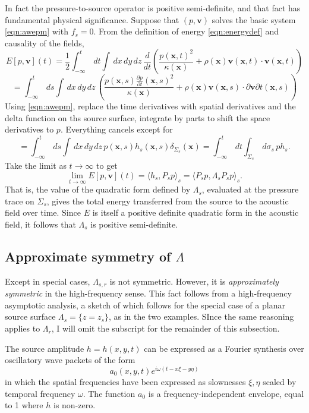 \documentclass[georeport,12pt]{geophysics}
\newcommand{\bx}{\mathbf{x}}
\newcommand{\bv}{\mathbf{v}}
\begin{document}
In fact the pressure-to-source operator is positive semi-definite, and that
fact has fundamental physical significance. Suppose that $(p,\bv)$
solves the basic system \ref{eqn:awepm} with $f_s=0$. From the
definition of energy \ref{eqn:energydef} and causality of the fields,
\[
 E[p,\bv](t) = \frac{1}{2} \int_{-\infty}^{t} \,dt \int \,dx\,dy\,dz\,
 \frac{d}{dt}\left(\frac{p(\bx,t)^2}{\kappa(\bx)} +
   \rho(\bx)\bv(\bx,t) \cdot \bv(\bx,t)\right)
\]
\[
  = \int_{-\infty}^{t} \,ds \int \,dx\,dy\,dz\,
 \left(\frac{p (\bx,s)\frac{\partial p}{\partial t}(\bx,s)^2}{\kappa(\bx)} +
   \rho(\bx)\bv(\bx,s) \cdot \partial{\bv}{\partial t}(\bx,s)\right)
\]
Using \ref{eqn:awepm}, replace the time derivatives with spatial derivatives and the delta
function on ths source surface, integrate by parts to shift the space
derivatives to $p$. Everything cancels except for
\[
  =  \int_{-\infty}^{t} \,ds \int \,dx\,dy\,dz\, p(\bx,s) h_s(\bx,s)
  \delta_{\Sigma_s}(\bx) = \int_{-\infty}^{t} \,dt \int_{\Sigma_s} \,d\sigma_s \, p h_s.
\]
Take the limit as $t \rightarrow \infty$ to get
\[
\lim_{t \rightarrow \infty} E[p,\bv](t) = \langle h_s, P_s p \rangle_s = \langle P_s p, \Lambda_s P_s p \rangle_s. 
\]
That is, the value of the quadratic form defined by
$\Lambda_s$, evaluated at the pressure trace on $\Sigma_s$,
gives the total energy transferred from the source to the
acoustic field over time. Since $E$ is itself a positive definite
quadratic form in the acoustic field, it follows that $
\Lambda_s$ is positive semi-definite. 

\subsection{Approximate symmetry of $\Lambda$}
Except in special cases, $\Lambda_{s,r}$ is not
symmetric. However, it is {\em approximately symmetric} in the
high-frequency sense. This fact follows from a high-frequency
asymptotic analysis, a sketch of which follows for the special case of
a planar source surface
$\Lambda_s=\{z=z_s\}$, as in the two examples. SInce the same reasoning
applies to $\Lambda_r$, I will omit the subscript for the remainder of
this subsection.

The source amplitude
$h=h(x,y,t)$ can be expressed as a Fourier synthesis over
oscillatory wave packets of the form
\begin{equation}
  \label{eqn:pwp}
 a_0(x,y,t) e^{i\omega(t-x\xi-y\eta)}
\end{equation}
in which the spatial frequencies have been expressed as slownesses
$\xi,\eta$ scaled by temporal frequency $\omega$. The function $a_0$
is a frequency-independent envelope, equal to 1 where $h$ is
non-zero.
\end{document}
